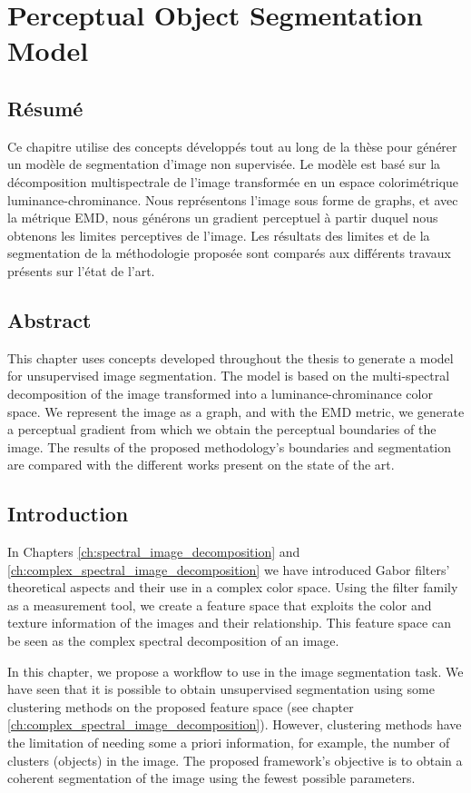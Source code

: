 
\chapter{Perceptual Object Segmentation Model} \label{ch:perceptual_object_boundaries_detection}

\section*{Résumé}
\noindent Ce chapitre utilise des concepts développés tout au long de la thèse pour générer un modèle de segmentation d'image non supervisée. Le modèle est basé sur la décomposition multispectrale de l'image transformée en un espace colorimétrique luminance-chrominance. Nous représentons l'image sous forme de graphs, et avec la métrique EMD, nous générons un gradient perceptuel à partir duquel nous obtenons les limites perceptives de l'image. Les résultats des limites et de la segmentation de la méthodologie proposée sont comparés aux différents travaux présents sur l'état de l'art.
\section*{Abstract}
\noindent This chapter uses concepts developed throughout the thesis to generate a model for unsupervised image segmentation. The model is based on the multi-spectral decomposition of the image transformed into a luminance-chrominance color space. We represent the image as a graph, and with the EMD metric, we generate a perceptual gradient from which we obtain the perceptual boundaries of the image. The results of the proposed methodology's boundaries and segmentation are compared with the different works present on the state of the art. 

\section{Introduction}
In Chapters \ref{ch:spectral_image_decomposition} and \ref{ch:complex_spectral_image_decomposition} we have introduced Gabor filters' theoretical aspects and their use in a complex color space. Using the filter family as a measurement tool, we create a feature space that exploits the color and texture information of the images and their relationship. This feature space can be seen as the complex spectral decomposition of an image.

In this chapter, we propose a workflow to use in the image segmentation task. We have seen that it is possible to obtain unsupervised segmentation using some clustering methods on the proposed feature space (see chapter \ref{ch:complex_spectral_image_decomposition}). However, clustering methods have the limitation of needing some a priori information, for example, the number of clusters (objects) in the image. The proposed framework's objective is to obtain a coherent segmentation of the image using the fewest possible parameters. 

